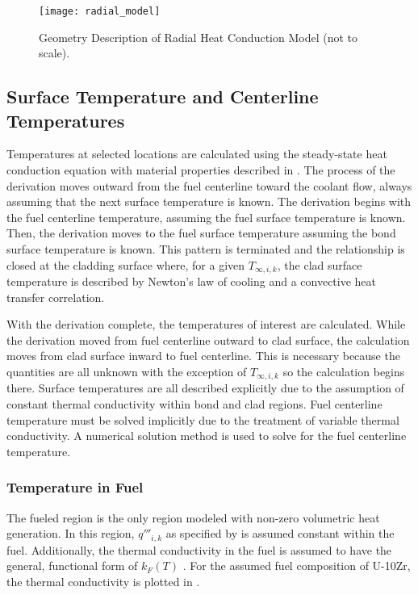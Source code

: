     \begin{figure}
      \centering
      \texttt{[image: radial\_model]}
      \caption{Geometry Description of Radial Heat Conduction Model (not to
        scale).}
      \label{fig:radial_model}
    \end{figure}

  \subsection{Surface Temperature and Centerline Temperatures}
    \label{sec:surface_temps}
    Temperatures at selected locations are calculated using the steady-state
    heat conduction equation with material properties described in
    . The process of the derivation moves outward
    from the fuel centerline toward the coolant flow, always assuming that the
    next surface temperature is known. The derivation begins with the fuel 
    centerline temperature, assuming the fuel surface temperature is known. 
    Then, the derivation moves to the fuel surface temperature assuming the bond 
    surface temperature is known. This pattern is terminated and the 
    relationship is closed at the cladding surface where, for a given 
    $T_{\infty,i,k}$, the clad surface temperature is described by Newton's law 
    of cooling and a convective heat transfer correlation. 

    With the derivation complete, the temperatures of interest are calculated.
    While the derivation moved from fuel centerline outward to clad surface,
    the calculation moves from clad surface inward to fuel centerline. This is
    necessary because the quantities are all unknown with the exception of
    $T_{\infty,i,k}$ so the calculation begins there. Surface temperatures are
    all described explicitly due to the assumption of constant thermal
    conductivity within bond and clad regions. Fuel centerline temperature must
    be solved implicitly due to the treatment of variable thermal conductivity.
    A numerical solution method is used to solve for the fuel centerline
    temperature.
    
    \subsubsection{Temperature in Fuel}
      \label{sec:temperature_in_fuel}
      The fueled region is the only region modeled with non-zero volumetric heat
      generation. In this region, $q'''_{i,k}$ as specified by
       is assumed constant within the fuel.
      Additionally, the thermal conductivity in the fuel is assumed to have the
      general, functional form of $k_F(T)$ \cite{fuelProp}. For the assumed
      fuel composition of U-10Zr, the thermal conductivity is plotted in
      .

